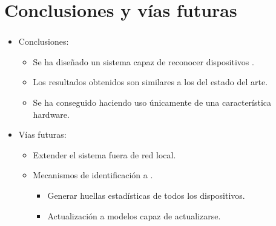 \section{Conclusiones y vías futuras}

\begin{frame}
\frametitle{\secname} %
\framesubtitle{} %
\rmfamily %
\color{black} %
\vspace{0.5cm}
\begin{itemize}
    \item Conclusiones:
        \begin{itemize}
            \item Se ha diseñado un sistema capaz de reconocer dispositivos .
            \item Los resultados obtenidos son similares a los del estado del arte.
            \item Se ha conseguido haciendo uso únicamente de una característica hardware.
        \end{itemize}
    \item Vías futuras:
        \begin{itemize}
            \item Extender el sistema fuera de red local.
            \item Mecanismos de identificación a .
                \begin{itemize}
                    \item Generar huellas estadísticas de todos los dispositivos.
                    \item Actualización a modelos capaz de actualizarse.
                \end{itemize}
        \end{itemize}
\end{itemize}
\end{frame}